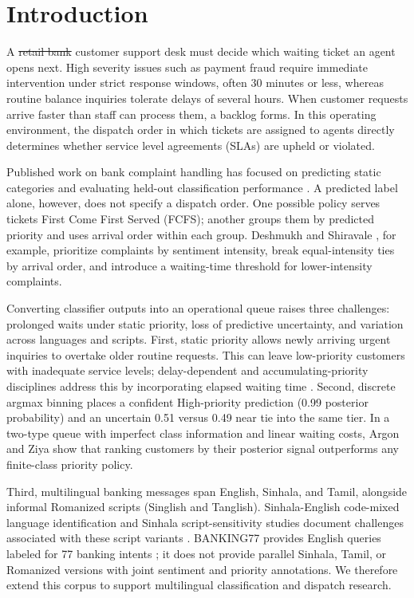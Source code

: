 \section{Introduction}
\label{sec:intro}

A \sout{retail bank} customer support desk must decide which waiting ticket an agent opens next. High severity issues such as payment fraud require immediate intervention under strict response windows, often 30 minutes or less, whereas routine balance inquiries tolerate delays of several hours. When customer requests arrive faster than staff can process them, a backlog forms. In this operating environment, the dispatch order in which tickets are assigned to agents directly determines whether service level agreements (SLAs) are upheld or violated.

Published work on bank complaint handling has focused on predicting static categories and evaluating held-out classification performance \cite{arya2026bank}. A predicted label alone, however, does not specify a dispatch order. One possible policy serves tickets First Come First Served (FCFS); another groups them by predicted priority and uses arrival order within each group. Deshmukh and Shiravale \cite{deshmukh2020priority}, for example, prioritize complaints by sentiment intensity, break equal-intensity ties by arrival order, and introduce a waiting-time threshold for lower-intensity complaints.

Converting classifier outputs into an operational queue raises three challenges: prolonged waits under static priority, loss of predictive uncertainty, and variation across languages and scripts. First, static priority allows newly arriving urgent inquiries to overtake older routine requests. This can leave low-priority customers with inadequate service levels; delay-dependent and accumulating-priority disciplines address this by incorporating elapsed waiting time \cite{kleinrock1964delay,stanford2014accumulating}. Second, discrete argmax binning places a confident High-priority prediction (0.99 posterior probability) and an uncertain 0.51 versus 0.49 near tie into the same tier. In a two-type queue with imperfect class information and linear waiting costs, Argon and Ziya \cite{argon2009priority} show that ranking customers by their posterior signal outperforms any finite-class priority policy.

Third, multilingual banking messages span English, Sinhala, and Tamil, alongside informal Romanized scripts (Singlish and Tanglish). Sinhala-English code-mixed language identification and Sinhala script-sensitivity studies document challenges associated with these script variants \cite{smith2020codemixed,rajapakse2026script}. BANKING77 provides English queries labeled for 77 banking intents \cite{casanueva2020banking77}; it does not provide parallel Sinhala, Tamil, or Romanized versions with joint sentiment and priority annotations. We therefore extend this corpus to support multilingual classification and dispatch research.

